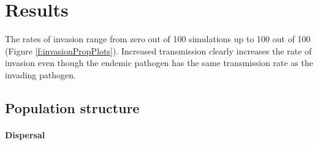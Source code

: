 





\section{Results}






































The rates of invasion range from zero out of 100 simulations up to 100 out of 100 (Figure \ref{f:invasionPropPlots}).
Increased transmission clearly increases the rate of invasion even though the endemic pathogen has the same transmission rate as the invading pathogen.
 


\subsection{Population structure}


\paragraph{Dispersal}


